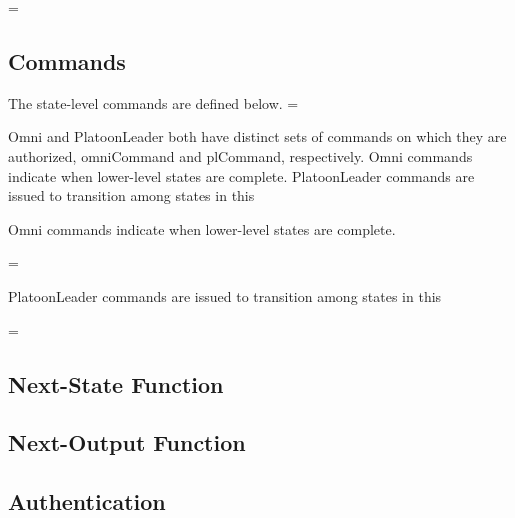 \documentclass[../../main/main.tex]{subfiles}
\begin{document}
 =  \HOLTokenBar{}  \HOLTokenBar{}  \HOLTokenBar{} 
         \HOLTokenBar{}  \HOLTokenBar{}  \HOLTokenBar{} 
         \HOLTokenBar{} 


\subsection{Commands}
The state-level commands are defined below.
 =   \HOLTokenBar{}  

Omni and PlatoonLeader both have distinct sets of commands on which they are authorized, omniCommand and plCommand, respectively.  Omni commands indicate when lower-level states are complete.  PlatoonLeader commands are issued to transition among states in this 

Omni commands indicate when lower-level states are complete.  

 =  \HOLTokenBar{} 
            \HOLTokenBar{}  \HOLTokenBar{} 
            \HOLTokenBar{}  \HOLTokenBar{} 

PlatoonLeader commands are issued to transition among states in this 

 =  \HOLTokenBar{}  \HOLTokenBar{}  \HOLTokenBar{} 
          \HOLTokenBar{}  \HOLTokenBar{} 

\subsection{Next-State Function}


\subsection{Next-Output Function}

\subsection{Authentication}
\end{document}
